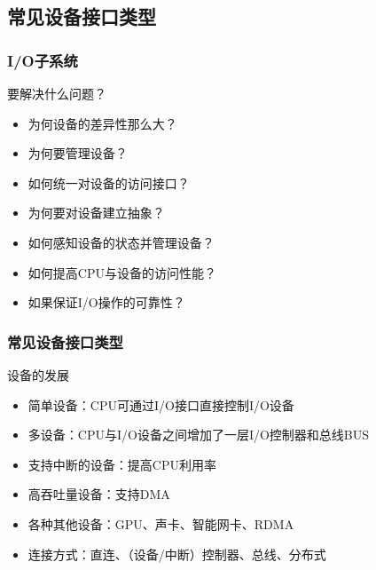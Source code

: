 \subsection{常见设备接口类型} %
\begin{frame}[fragile]
    \frametitle{I/O子系统}
    要解决什么问题？
    \begin{itemize}
        \item 为何设备的差异性那么大？
        \item 为何要管理设备？ \pause
        \item 如何统一对设备的访问接口？
        \item 为何要对设备建立抽象？ \pause
        \item 如何感知设备的状态并管理设备？
        \item 如何提高CPU与设备的访问性能？
        \item 如果保证I/O操作的可靠性？
    \end{itemize}
\end{frame}
\begin{frame}[fragile]
    \frametitle{常见设备接口类型}
    设备的发展
    \begin{itemize}
        \item 简单设备：CPU可通过I/O接口直接控制I/O设备
        \item 多设备：CPU与I/O设备之间增加了一层I/O控制器和总线BUS
        \item 支持中断的设备：提高CPU利用率
        \item 高吞吐量设备：支持DMA
        \item 各种其他设备：GPU、声卡、智能网卡、RDMA
        \item 连接方式：直连、（设备/中断）控制器、总线、分布式
    \end{itemize}
\end{frame}
